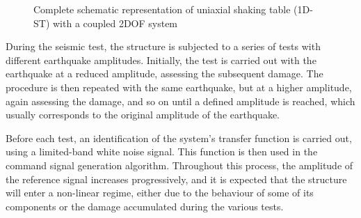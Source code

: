 \documentclass[9pt]{extarticle}
\begin{document}
\begin{figure}[H]
    \centering
    \caption{Complete schematic representation of uniaxial shaking table (1D-ST) with a coupled 2DOF system \citep{oliveira2015}}
    \label{fig_schematic_st1d_Fernando}
\end{figure}

During the seismic test, the structure is subjected to a series of tests with different earthquake amplitudes. Initially, the test is carried out with the earthquake at a reduced amplitude, assessing the subsequent damage. The procedure is then repeated with the same earthquake, but at a higher amplitude, again assessing the damage, and so on until a defined amplitude is reached, which usually corresponds to the original amplitude of the earthquake.

Before each test, an identification of the system's transfer function is carried out, using a limited-band white noise signal.%
This function is then used in the command signal generation algorithm. Throughout this process, the amplitude of the reference signal increases progressively, and it is expected that the structure will enter a non-linear regime, either due to the behaviour of some of its components or the damage accumulated during the various tests.
\end{document}
